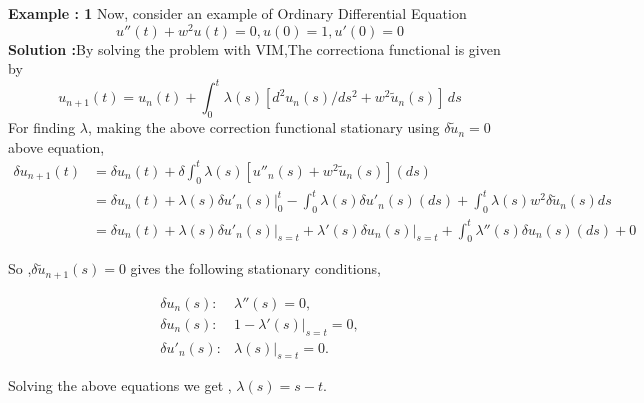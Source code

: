 \documentclass[12pt, a4paper]{report}
\begin{document}
\textbf{Example : 1} Now, consider an example of Ordinary Differential Equation
\begin{equation}
    u''(t) +w^2 u(t) = 0, 
    u(0)=1 , u'(0)= 0
\end{equation}
\textbf{Solution :}By solving the problem with VIM,The correctiona functional is given by
\begin{equation}
    u_{n+1}(t) = u_n(t) + \int_{0}^{t} \lambda(s) [d^2u_n(s)/ds^2+w^2 \tilde{u}_n(s)]\,ds
\end{equation}
For finding $\lambda$, making the above correction functional stationary using $\delta \tilde{u}_{n}=0$ above equation,
\begin{align*}
    
    \delta u_{n+1} (t) & = \delta  u_{n} (t) +  \delta  \int_0^t  \lambda (s) [u''_n (s) + w^2 \tilde{u}_n(s)](ds) \\
    
    & = \delta u_{n} (t) + \lambda (s)\delta u'_{n} (s)\bigg|_0^t - \int_0^t \lambda(s) \delta u'_{n} (s) (ds) + \int_0^t \lambda(s) w^2 \delta \tilde{u}_n(s) ds \\
    
    & = \delta u_{n} (t) + \lambda (s)\delta u'_{n} (s)\bigg|_{s=t} + \lambda '(s) \delta u_{n} (s) \bigg|_{s=t} + \int_0^t \lambda''(s) \delta u_{n} (s) (ds) + 0
\end{align*}



\vspace{3.5pt}

So ,$\delta \tilde{u}_{n+1}(s) = 0 $ gives the following stationary conditions,

\vspace{3.5pt}

\[
\begin{array}{ll}
    \delta u_{n}(s) : & \lambda''(s) = 0 , \\
    
    \delta u_{n}(s) : & 1 - \lambda'(s)\bigg|_{s=t} = 0 , \\
    
    \delta u'_{n}(s) : & \lambda(s)\bigg|_{s=t} = 0.
\end{array}
\]
\vspace{3.5pt}

Solving the above equations we get , $\lambda (s) = s-t $.
\vspace{4.5pt}
\end{document}
